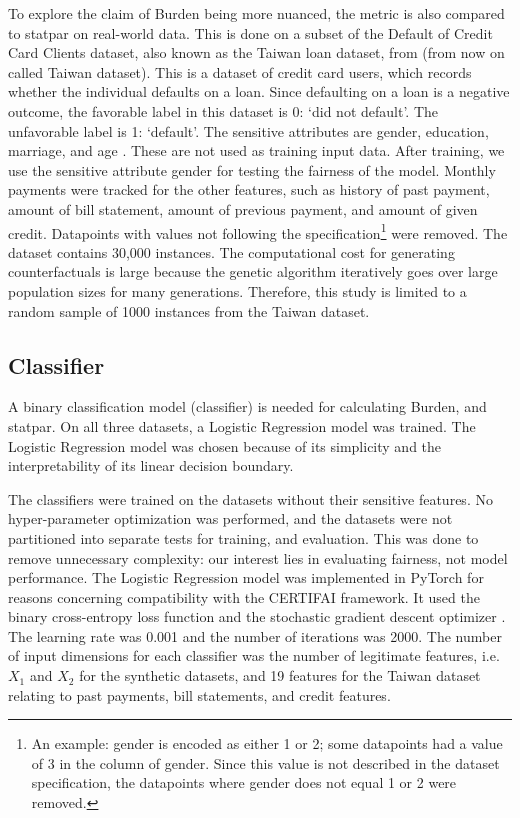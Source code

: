 \documentclass[runningheads]{llncs}
\begin{document}
To explore the claim of \gls{Burden} being more nuanced, the metric is also compared to \gls{statpar} on real-world data. This is done on a subset of the Default of Credit Card Clients dataset, also known as the Taiwan loan dataset, from \cite{dataset} (from now on called Taiwan dataset). This is a dataset of credit card users, which records whether the individual defaults on a loan. Since defaulting on a loan is a negative outcome, the favorable label in this dataset is 0: `did not default'. The unfavorable label is 1: `default'. The sensitive attributes are gender, education, marriage, and age \cite{eusex}. These are not used as training input data. After training, we use the sensitive attribute gender for testing the fairness of the model. Monthly payments were tracked for the other features, such as history of past payment, amount of bill statement, amount of previous payment, and amount of given credit. Datapoints with values not following the specification\footnote{An example: gender is encoded as either 1 or 2; some datapoints had a value of 3 in the column of gender. Since this value is not described in the dataset specification, the datapoints where gender does not equal 1 or 2 were removed.} were removed. The dataset contains 30,000 instances. The computational cost for generating counterfactuals is large because the genetic algorithm iteratively goes over large population sizes for many generations. Therefore, this study is limited to a random sample of 1000 instances from the Taiwan dataset.


\subsection{Classifier}\label{sec:model}
A binary classification model (classifier) is needed for calculating \gls{Burden}, and \gls{statpar}. On all three datasets, a Logistic Regression model \cite{cox1958regression} was trained. The Logistic Regression model was chosen because of its simplicity and the interpretability of its linear decision boundary.

The classifiers were trained on the datasets without their sensitive features. No hyper-parameter optimization was performed, and the datasets were not partitioned into separate tests for training, and evaluation. This was done to remove unnecessary complexity: our interest lies in evaluating fairness, not model performance. The Logistic Regression model was implemented in PyTorch for reasons concerning compatibility with the CERTIFAI framework. It used the binary cross-entropy loss function \cite{cox1958regression} and the stochastic gradient descent optimizer \cite{robbins1951stochastic}. The learning rate was 0.001 and the number of iterations was 2000. The number of input dimensions for each classifier was the number of \gls{legitimate} features, i.e. $X_1$ and $X_2$ for the synthetic datasets, and 19 features for the Taiwan dataset relating to past payments, bill statements, and credit features.
\end{document}
